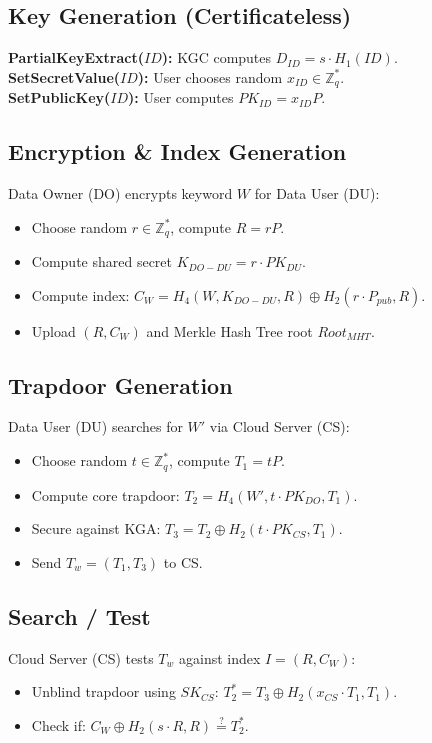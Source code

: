 \documentclass[10pt,journal,compsoc]{IEEEtran}
\begin{document}
\subsection{Key Generation (Certificateless)}
\textbf{PartialKeyExtract($ID$):} KGC computes $D_{ID} = s \cdot H_1(ID)$.\\
\textbf{SetSecretValue($ID$):} User chooses random $x_{ID} \in \mathbb{Z}_q^*$.\\
\textbf{SetPublicKey($ID$):} User computes $PK_{ID} = x_{ID}P$.

\subsection{Encryption \& Index Generation}
Data Owner (DO) encrypts keyword $W$ for Data User (DU):
\begin{itemize}
    \item Choose random $r \in \mathbb{Z}_q^*$, compute $R = rP$.
    \item Compute shared secret $K_{DO-DU} = r \cdot PK_{DU}$.
    \item Compute index: $C_W = H_4(W, K_{DO-DU}, R) \oplus H_2(r \cdot P_{pub}, R)$.
    \item Upload $(R, C_W)$ and Merkle Hash Tree root $Root_{MHT}$.
\end{itemize}

\subsection{Trapdoor Generation}
Data User (DU) searches for $W'$ via Cloud Server (CS):
\begin{itemize}
    \item Choose random $t \in \mathbb{Z}_q^*$, compute $T_1 = tP$.
    \item Compute core trapdoor: $T_2 = H_4(W', t \cdot PK_{DO}, T_1)$.
    \item Secure against KGA: $T_3 = T_2 \oplus H_2(t \cdot PK_{CS}, T_1)$.
    \item Send $T_w = (T_1, T_3)$ to CS.
\end{itemize}

\subsection{Search / Test}
Cloud Server (CS) tests $T_w$ against index $I = (R, C_W)$:
\begin{itemize}
    \item Unblind trapdoor using $SK_{CS}$: $T_2^* = T_3 \oplus H_2(x_{CS} \cdot T_1, T_1)$.
    \item Check if: $C_W \oplus H_2(s \cdot R, R) \stackrel{?}{=} T_2^*$.
\end{itemize}
\end{document}
